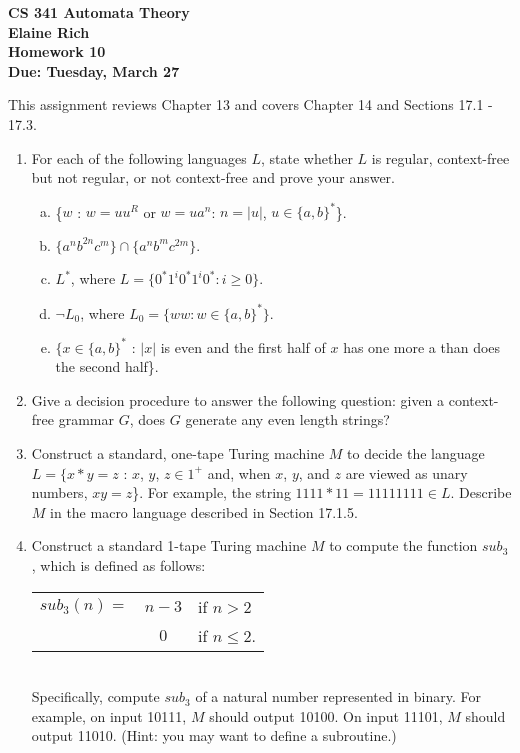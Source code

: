 \documentclass[10pt]{article}
\newcommand{\card}[1]{\left| #1 \right|}
\begin{document}
\begin{center}
\textbf{
CS 341 Automata Theory \\
Elaine Rich \\
Homework 10 \\
Due: Tuesday, March 27}\\
\end{center}
\noindent
This assignment reviews Chapter 13 and covers Chapter 14 and Sections 17.1 - 17.3. \\

\begin{enumerate}[1)]


\item
For each of the following languages $L$, state whether $L$ is regular, context-free but not regular, or not context-free and prove your answer.
\begin{enumerate}[a)]
\item
\{$w$ : $w = uu^R$ or $w = ua^n$: $n = \card{u}$, $u \in \{a, b\}^*$\}.

\item
$\{a^nb^{2n}c^m\} \cap \{a^nb^mc^{2m}\}$.

\item
$L^*$, where $L = \{0^*1^i0^*1^i0^* : i \geq 0\}$.

\item
$\lnot L_0$, where $L_0 = \{ww : w \in \{a, b\}^*\}$.

\item
$\{x \in \{a, b\}^*$ : $\card{x}$ is even and the first half of $x$ has one more a than does the second half\}.
\end{enumerate}


\item
Give a decision procedure to answer the following question: given a context-free grammar $G$, does $G$ generate any even length strings?


\item
Construct a standard, one-tape Turing machine $M$ to decide the language $L = \{x * y = z$ : $x$, $y$, $z \in 1^+$ and, when  $x$,  $y$, and  $z$ are viewed as unary numbers,  $xy =  z$\}.  For example, the string  $1111*11=11111111 \in L$.  Describe $M$ in the macro language described in Section 17.1.5.



\item
Construct a standard 1-tape Turing machine $M$ to compute the function $sub_3$, which is defined as follows:
\begin{tabular}{l c l}
$sub_3(n) =$&$n-3$ &if $n > 2$\\
&$0$&if $n \leq 2$.\\
\end{tabular}\\
Specifically, compute  $sub_3$ of a natural number represented in binary.  For example, on input 10111, $M$ should output 10100.  On input 11101, $M$ should output 11010.  (Hint: you may want to define a subroutine.)
\end{enumerate}
\end{document}
